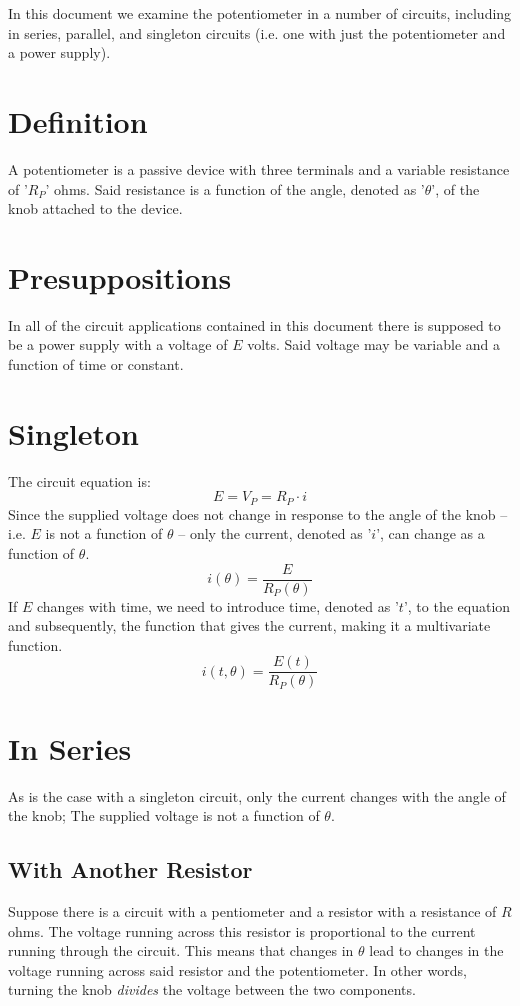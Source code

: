 \documentclass{article}
\begin{document}
	In this document we examine the potentiometer in a number of circuits, 
	including in series, parallel, and singleton circuits (i.e. one with just 
	the potentiometer and a power supply).
	\section{Definition}
	A potentiometer is a passive device with three terminals and a variable 
	resistance of '$R_P$' ohms.  Said resistance is a function of the angle, 
	denoted as '$\theta$', of the knob attached to the device.
	\section{Presuppositions}
	In all of the circuit applications contained in this document there is 
	supposed to be a power supply with a voltage of $E$ volts.  Said voltage 
	may be variable and a function of time or constant.
	\section{Singleton}
	The circuit equation is:
	\begin{equation}\label{eq:V_P}
		E = V_P = R_P \cdot i
	\end{equation}
	Since the supplied voltage does not change in response to the angle of the 
	knob -- i.e. $E$ is not a function of $\theta$ -- only the current, denoted 
	as '$i$', can change as a function of $\theta$.
	$$ i(\theta) = \frac{E}{R_P(\theta)}$$
	If $E$ changes with time, we need to introduce time, denoted as '$t$', to 
	the equation and subsequently, the function that gives the current, making 
	it a multivariate function.
	$$ i(t, \theta) = \frac{E(t)}{R_P(\theta)}$$
	\section[Series]{In Series}
	As is the case with a singleton circuit, only the current changes with the 
	angle of the knob;  The supplied voltage is not a function of $\theta$.
	\subsection[Resistor]{With Another Resistor}
	Suppose there is a circuit with a pentiometer and a resistor with 
	a resistance of $R$ ohms.  The voltage running across this resistor is 
	proportional to the current running through the circuit.  This means that 
	changes in $\theta$ lead to changes in the voltage running across said 
	resistor and the potentiometer.  In other words, turning the knob 	
	\emph{divides} the voltage between the two components.
\end{document}
